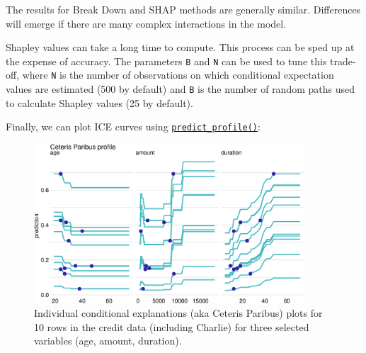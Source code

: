 The results for Break Down and SHAP methods are generally similar.
Differences will emerge if there are many complex interactions in the
model.

\begin{tcolorbox}[enhanced jigsaw, opacitybacktitle=0.6, rightrule=.15mm, opacityback=0, arc=.35mm, breakable, titlerule=0mm, colframe=quarto-callout-tip-color-frame, coltitle=black, bottomrule=.15mm, toprule=.15mm, colback=white, colbacktitle=quarto-callout-tip-color!10!white, bottomtitle=1mm, toptitle=1mm, title=\textcolor{quarto-callout-tip-color}{\faLightbulb}\hspace{0.5em}{Speeding Up Shapley Computation}, leftrule=.75mm, left=2mm]

Shapley values can take a long time to compute. This process can be sped
up at the expense of accuracy. The parameters \texttt{B} and \texttt{N}
can be used to tune this trade-off, where \texttt{N} is the number of
observations on which conditional expectation values are estimated (500
by default) and \texttt{B} is the number of random paths used to
calculate Shapley values (25 by default).

\end{tcolorbox}

Finally, we can plot ICE curves using
\href{https://www.rdocumentation.org/packages/DALEX/topics/predict_profile}{\texttt{predict\_profile()}}:

\begin{Shaded}
\begin{Highlighting}[]
\NormalTok{(}\NormalTok{(gbm\_exp,  credit\_x[}\SpecialCharTok{:}\NormalTok{, ]))}
\end{Highlighting}
\end{Shaded}

\begin{figure}[H]

{\centering \includegraphics[width=0.9\textwidth,height=\textheight]{chapters/chapter12/model_interpretation_files/figure-pdf/fig-dalex-ice-1.pdf}

}

\caption{\label{fig-dalex-ice}Individual conditional explanations (aka
Ceteris Paribus) plots for 10 rows in the credit data (including
Charlie) for three selected variables (age, amount, duration).}

\end{figure}

